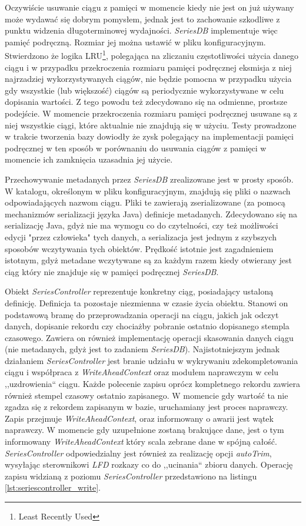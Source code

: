 \documentclass[a4paper,polish,12pt,twoside]{article}
\begin{document}
Oczywiście usuwanie ciągu z pamięci w momencie kiedy nie jest on już używany może wydawać się dobrym pomysłem, jednak jest to zachowanie szkodliwe z punktu widzenia długoterminowej wydajności. \textit{SeriesDB} implementuje więc pamięć podręczną. Rozmiar jej można ustawić w pliku konfiguracyjnym. Stwierdzono że logika LRU\footnote{Least Recently Used}, polegająca na zliczaniu częstotliwości użycia danego ciągu i w przypadku przekroczenia rozmiaru pamięci podręcznej eksmisja z niej najrzadziej wykorzystywanych ciągów, nie będzie pomocna w przypadku użycia gdy wszystkie (lub większość) ciągów są periodycznie wykorzystywane w celu dopisania wartości. Z tego powodu też zdecydowano się na odmienne, prostsze podejście. W momencie przekroczenia rozmiaru pamięci podręcznej usuwane są z niej wszystkie ciągi, które aktualnie nie znajdują się w użyciu. Testy prowadzone w trakcie tworzenia bazy dowiodły że zysk polegający na implementacji pamięci podręcznej w ten sposób w porównaniu do usuwania ciągów z pamięci w momencie ich zamknięcia uzasadnia jej użycie.

Przechowywanie metadanych przez \textit{SeriesDB} zrealizowane jest w prosty sposób. W katalogu, określonym w pliku konfiguracyjnym, znajdują się pliki o nazwach odpowiadających nazwom ciągu. Pliki te zawierają zserializowane (za pomocą mechanizmów serializacji języka Java) definicje metadanych. Zdecydowano się na serializację Java, gdyż nie ma wymogu co do czytelności, czy też możliwości edycji "przez człowieka" tych danych, a serializacja jest jednym z szybszych sposobów wczytywania tych obiektów. Prędkość istotnie jest zagadnieniem istotnym, gdyż metadane wczytywane są za każdym razem kiedy otwierany jest ciąg który nie znajduje się w pamięci podręcznej \textit{SeriesDB}.

Obiekt \textit{SeriesController} reprezentuje konkretny ciąg, posiadający ustaloną definicję. Definicja ta pozostaje niezmienna w czasie życia obiektu. Stanowi on podstawową bramę do przeprowadzania operacji na ciągu, jakich jak odczyt danych, dopisanie rekordu czy chociażby pobranie ostatnio dopisanego stempla czasowego. Zawiera on również implementację operacji skasowania danych ciągu (nie metadanych, gdyż jest to zadaniem \textit{SeriesDB}). Najistotniejszym jednak działaniem \textit{SeriesController} jest branie udziału w wykrywaniu zdekompletowania ciągu i współpraca z \textit{WriteAheadContext} oraz modułem naprawczym w celu ,,uzdrowienia`` ciągu. Każde polecenie zapisu oprócz kompletnego rekordu zawiera również stempel czasowy ostatnio zapisanego. W momencie gdy wartość ta nie zgadza się z rekordem zapisanym w bazie, uruchamiany jest proces naprawczy. Zapis przejmuje \textit{WriteAheadContext}, oraz informowany o awarii jest wątek naprawczy. W momencie gdy uzupełnione zostaną brakujące dane, jest o tym informowany \textit{WriteAheadContext} który scala zebrane dane w spójną całość. \textit{SeriesController} odpowiedzialny jest również za realizację opcji \textit{autoTrim}, wysyłając sterownikowi \textit{LFD} rozkazy co do ,,ucinania`` zbioru danych. Operację zapisu widzianą z poziomu \textit{SeriesController} przedstawiono na listingu \ref{lst:seriescontroller_write}.
\end{document}
